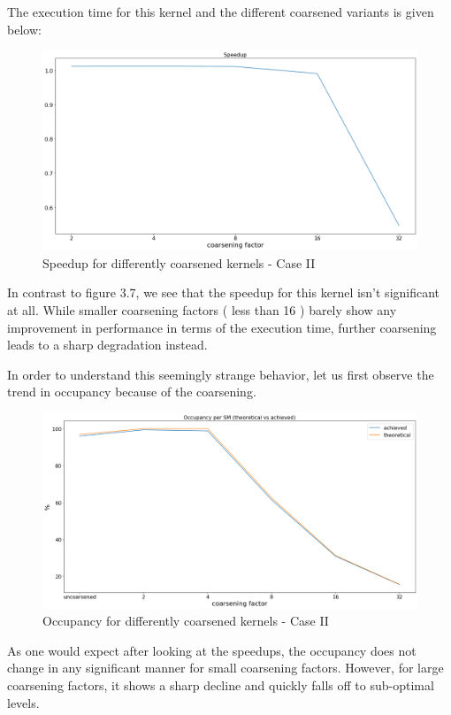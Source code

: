 The execution time for this kernel and the different coarsened variants is given below:

\begin{figure}[ht]
	\centering
	\includegraphics[scale=0.30]{Pictures/plots/poor_improvement/speedup.png}
	\caption{\small Speedup for differently coarsened kernels - Case II}
\end{figure}

In contrast to figure 3.7, we see that the speedup for this kernel isn't significant at all. While smaller coarsening factors ( less than 16 ) barely show any improvement in performance in terms of the execution time, further coarsening leads to a sharp degradation instead.

In order to understand this seemingly strange behavior, let us first observe the trend in occupancy because of the coarsening.

\begin{figure}[ht]
	\centering
	\includegraphics[scale=0.30]{Pictures/plots/poor_improvement/occupancy both.png}
	\caption{\small Occupancy for differently coarsened kernels - Case II}
\end{figure}

As one would expect after looking at the speedups, the occupancy does not change in any significant manner for small coarsening factors. However, for large coarsening factors, it shows a sharp decline and quickly falls off to sub-optimal levels.

